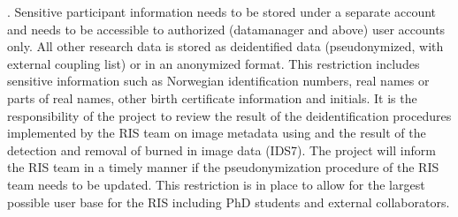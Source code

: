\documentclass[letterpaper,10pt,english]{sphinxmanual}
\begin{document}
. Sensitive participant information needs to be stored under a separate account and needs to be accessible to authorized (data\sphinxhyphen{}manager and above) user accounts only. All other research data is stored as de\sphinxhyphen{}identified data (pseudonymized, with external coupling list) or in an anonymized format. This restriction includes sensitive information such as Norwegian identification numbers, real names or parts of real names, other birth certificate information and initials. It is the responsibility of the project to review the result of the de\sphinxhyphen{}identification procedures implemented by the RIS team on image meta\sphinxhyphen{}data using  and the result of the detection and removal of burned in image data (IDS7). The project will inform the RIS team in a timely manner if the
pseudonymization procedure of the RIS team needs to be updated. This restriction is in place to allow for the largest possible user base for the RIS including PhD students and external collaborators.
\end{document}
